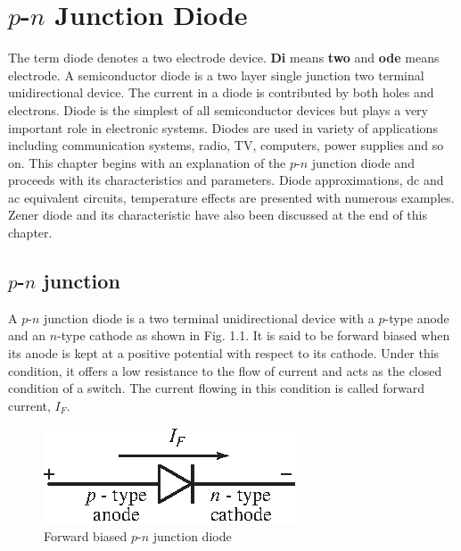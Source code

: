 \chapter{$p$-$n$ Junction Diode}\label{chap1}

The term diode denotes a two electrode device. {\bf Di} means {\bf two} and {\bf ode} means electrode. A semiconductor diode is a two layer single junction two terminal unidirectional device. The current in a diode is contributed by both holes and electrons. Diode is the simplest of all semiconductor devices but plays a very important role in electronic systems. Diodes are used in variety of applications including communication systems, radio, TV, computers, power supplies and so on.  
This chapter begins with an explanation of the $p$-$n$ junction diode
and proceeds with its characteristics and parameters. Diode
approximations, dc and ac equivalent circuits, temperature effects are
presented with numerous examples. Zener diode and its characteristic have also been discussed at the end of this chapter.

\section{{\boldmath$p$-$n$} junction}\label{sec1.1}

A $p$-$n$ junction diode is a two terminal unidirectional device with
a $p$-type anode and an $n$-type cathode as shown in Fig. 1.1. It is
said to be forward biased when its anode is kept at a positive
potential with respect to its cathode. Under this condition, it
offers a low resistance to the flow of current and acts as the closed
condition of a switch. The current flowing in this condition is called
forward current, $I_F$.
\begin{figure}[H]
\centering
\includegraphics[scale=1.25]{chap1/S3-EE-01-001.eps}
\caption{Forward biased $p$-$n$ junction diode}\label{fig1.1}
\end{figure}

\eject

